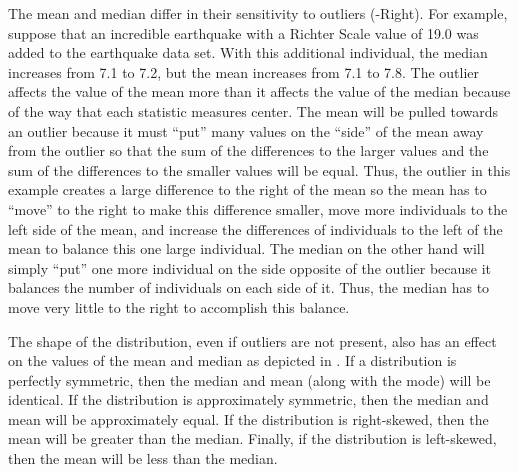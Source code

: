 The mean and median differ in their sensitivity to outliers (-Right).  For example, suppose that an incredible earthquake with a Richter Scale value of 19.0 was added to the earthquake data set. With this additional individual, the median increases from 7.1 to 7.2, but the mean increases from 7.1 to 7.8. The outlier affects the value of the mean more than it affects the value of the median because of the way that each statistic measures center. The mean will be pulled towards an outlier because it must ``put'' many values on the ``side'' of the mean away from the outlier so that the sum of the differences to the larger values and the sum of the differences to the smaller values will be equal. Thus, the outlier in this example creates a large difference to the right of the mean so the mean has to ``move'' to the right to make this difference smaller, move more individuals to the left side of the mean, and increase the differences of individuals to the left of the mean to balance this one large individual. The median on the other hand will simply ``put'' one more individual on the side opposite of the outlier because it balances the number of individuals on each side of it. Thus, the median has to move very little to the right to accomplish this balance.


The shape of the distribution, even if outliers are not present, also has an effect on the values of the mean and median as depicted in . If a distribution is perfectly symmetric, then the median and mean (along with the mode) will be identical. If the distribution is approximately symmetric, then the median and mean will be approximately equal. If the distribution is right-skewed, then the mean will be greater than the median. Finally, if the distribution is left-skewed, then the mean will be less than the median.

